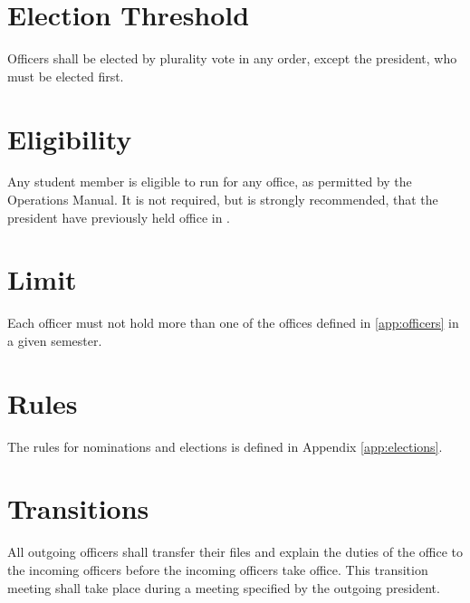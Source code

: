 
\section{Election Threshold}
Officers shall be elected by plurality vote in any order, except the president, who must be elected first.
\section{Eligibility}
Any student member is eligible to run for any office, as permitted by the \hkn Operations Manual. It is not required, but is strongly recommended, that the president have previously held office in \hkn.
\section{Limit}
Each officer must not hold more than one of the offices defined in \ref{app:officers} in a given semester.
\section{Rules}
The rules for nominations and elections is defined in Appendix \ref{app:elections}.
\section{Transitions}
All outgoing officers shall transfer their files and explain the duties of the office to the incoming officers before the incoming officers take office. This transition meeting shall take place during a meeting specified by the outgoing president.

